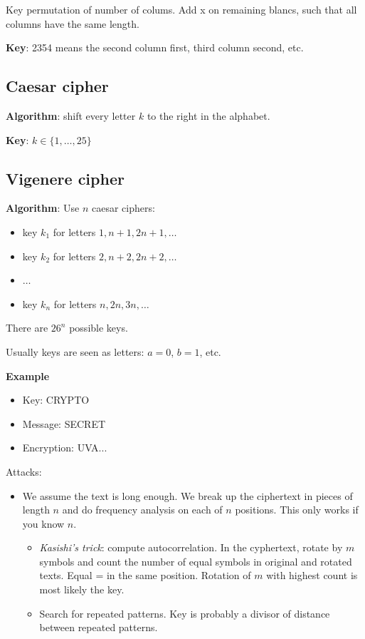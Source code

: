 \documentclass[language=english,number=]{homework}
\begin{document}
Key permutation of number of colums.
Add x on remaining blancs, such that all columns have the same length.

\textbf{Key}: 2354 means the second column first, third column second, etc.

\subsection{Caesar cipher}

\textbf{Algorithm}: shift every letter $k$ to the right in the alphabet.

\textbf{Key}: $k \in \{1, \dots, 25\}$

\subsection{Vigenere cipher}

\textbf{Algorithm}: Use $n$ caesar ciphers:
\begin{itemize}
\item key $k_1$ for letters $1, n+1, 2n+1, \dots$
\item key $k_2$ for letters $2, n+2, 2n+2, \dots$
\item $\dots$
\item key $k_n$ for letters $n, 2n, 3n, \dots$
\end{itemize}
There are $26^n$ possible keys.

Usually keys are seen as letters: $a=0$, $b=1$, etc.

\textbf{Example}
\begin{itemize}
\item Key: CRYPTO
\item Message: SECRET
\item Encryption: UVA...
\end{itemize}

Attacks:
\begin{itemize}
\item We assume the text is long enough. We break up the ciphertext in pieces of length $n$ and do frequency analysis on each of $n$ positions.
This only works if you know $n$.
\begin{itemize}
\item \textit{Kasishi's trick}: compute autocorrelation.
In the cyphertext, rotate by $m$ symbols and count the number of equal symbols in original and rotated texts.
Equal = in the same position.
Rotation of $m$ with highest count is most likely the key.
\item Search for repeated patterns.
Key is probably a divisor of distance between repeated patterns.
\end{itemize}
\end{itemize}
\end{document}
